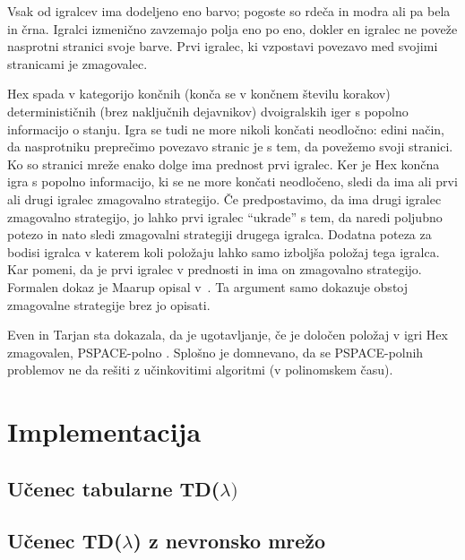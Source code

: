 \documentclass[a4paper, oneside, 12pt]{report}
\begin{document}
Vsak od igralcev ima dodeljeno eno barvo; pogoste so rdeča in modra ali pa bela in črna. Igralci izmenično zavzemajo polja eno po eno, dokler en igralec ne poveže nasprotni stranici svoje barve. Prvi igralec, ki vzpostavi povezavo med svojimi stranicami je zmagovalec.

Hex spada v kategorijo končnih (konča se v končnem številu korakov) determinističnih (brez naključnih dejavnikov) dvoigralskih iger s popolno informacijo o stanju. Igra se tudi ne more nikoli končati neodločno: edini način, da nasprotniku preprečimo povezavo stranic je s tem, da povežemo svoji stranici. Ko so stranici mreže enako dolge ima prednost prvi igralec. Ker je Hex končna igra s popolno informacijo, ki se ne more končati neodločeno, sledi da ima ali prvi ali drugi igralec zmagovalno strategijo. Če predpostavimo, da ima drugi igralec zmagovalno strategijo, jo lahko prvi igralec ``ukrade'' s tem, da naredi poljubno potezo in nato sledi zmagovalni strategiji drugega igralca. Dodatna poteza za bodisi igralca v katerem koli položaju lahko samo izboljša položaj tega igralca. Kar pomeni, da je prvi igralec v prednosti in ima on zmagovalno strategijo. Formalen dokaz je Maarup opisal v~\cite{Hex}. Ta argument samo dokazuje obstoj zmagovalne strategije brez jo opisati.

Even in Tarjan sta dokazala, da je ugotavljanje, če je določen položaj v igri Hex zmagovalen, PSPACE-polno \cite{ACombinatorialProblemWhichIsCompleteInPolynomialSpace}. Splošno je domnevano, da se PSPACE-polnih problemov ne da rešiti z učinkovitimi algoritmi (v polinomskem času).





\section{Implementacija}


\subsection{Učenec tabularne TD($\lambda)$}


\subsection{Učenec TD($\lambda$) z nevronsko mrežo}
\end{document}

